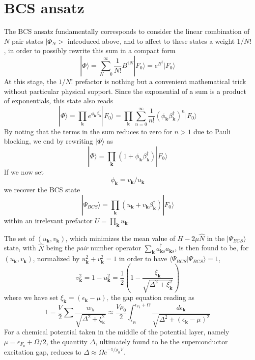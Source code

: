 \documentclass[aps,prb,preprint,groupedaddress,amsmath]{revtex4-1}
\newcommand{\vk}{\ensuremath{\mathbf{k}}}
\newcommand{\dg}{\ensuremath{\dagger}}
\begin{document}
\section{BCS  ansatz\label{sec:bcs}}
The BCS ansatz fundamentally corresponds to consider the linear combination of $N$ pair states $|\Phi_N>$ introduced above, and to affect to these states a weight $1/N!$, in order to possibly rewrite this sum in a compact form
\begin{equation}
|\Phi{\rangle}=\sum^\infty_{N=0}\frac{1}{N!}B^{\dg{}N}|F_0{\rangle}=e^{B^\dg}|F_0{\rangle}
\label{eq:BcsPhi}
\end{equation}
At this stage, the $1/N!$ prefactor is nothing but  a convenient mathematical trick without particular physical support. Since the exponential of a sum is a product of exponentials, this state also reads 
\begin{equation}
|\Phi{\rangle}=\prod_\vk{}e^{\phi_\vk\beta^\dg_\vk}|F_0{\rangle}=\prod_\vk{}\sum_{n=0}^\infty\frac{1}{n!}({\phi_\vk\beta^\dg_\vk})^n|F_0{\rangle}
\label{eq:BcsPhi2}
\end{equation}
By noting that the terms in the sum reduces to zero for $n>1$ due to Pauli blocking, we end by rewriting $|\Phi\rangle$ as 
\begin{equation}
|\Phi{\rangle}=\prod_\vk{}({1+\phi_\vk\beta^\dg_\vk})|F_0{\rangle}
\label{eq:BcsPhi3}
\end{equation}
If we now set 
\begin{equation}\label{eq:phiUv}
\phi_\vk=v_\vk/u_\vk
\end{equation}
 we recover the  BCS state
\begin{equation}
|\Psi_{BCS}{\rangle}=\prod_\vk{}({u_\vk+v_\vk\beta^\dg_\vk})|F_0{\rangle}
\label{eq:Bcs1}
\end{equation}
within an irrelevant prefactor $U=\prod_\vk{u_\vk}$.  

The set of $(u_\vk,v_\vk)$,  which minimizes the mean value of   $H-2\mu\hat{N}$ in the $|\Psi_{BCS}\rangle$ state, with $\hat{N}$ being the \emph{pair} number operator $\sum_\vk{}a^\dg_{\vk{}s}a^{}_{\vk{}s}$,  is then found to be, for   $(u_\vk,v_\vk)$, normalized by $u_\vk^2+v_\vk^2=1$ in order to have $\langle\Psi_{BCS}|\Psi_{BCS}\rangle=1$,
\begin{equation}\label{eq:v}
v^2_\vk=1-u_\vk^2=\frac{1}{2}\left(1-\frac{\xi_\vk}{\sqrt{\Delta^2+\xi_\vk^2}}\right)
\end{equation}
where we have set $\xi_\vk=(\epsilon_\vk-\mu)$, the gap equation reading as
\begin{equation}
1=\frac{V}{2}\sum\frac{w_\vk}{\sqrt{\Delta^2+\xi_\vk^2}}\approx%
	\frac{V\rho_0}{2}\int_{\epsilon_{F_0}}^{\epsilon_{F_0}+\Omega}%
	\frac{d\epsilon_\vk}{\sqrt{\Delta^2+(\epsilon_\vk-\mu)^2}}
\end{equation}
For a chemical potential taken in the middle of the potential layer, namely $\mu=\epsilon_{F_0}+\Omega/2$, the quantity $\Delta$, ultimately found to be the superconductor excitation gap, reduces to  $\Delta\approx\Omega{}e^{-1/\rho_0V}$.
\end{document}
